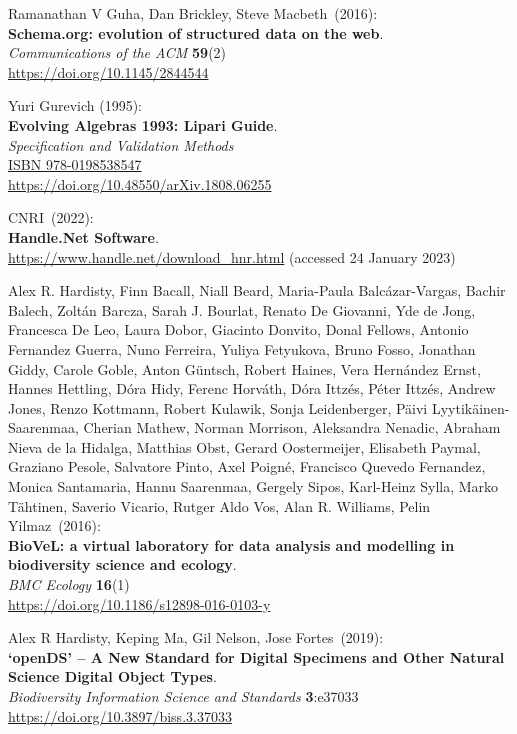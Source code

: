 \begin{thebibliography}{9}
Ramanathan V Guha, Dan Brickley, Steve Macbeth~(2016): \\
\textbf{Schema.org: evolution of structured data on the web}.\\
\emph{Communications of the ACM} \textbf{59}(2)\\
\url{https://doi.org/10.1145/2844544}

Yuri Gurevich (1995):\\
\textbf{Evolving Algebras 1993: Lipari Guide}.\\
\emph{Specification and Validation Methods} \\
\href{https://identifiers.org/isbn/9780198538547}{ISBN 978-0198538547} \\
\url{https://doi.org/10.48550/arXiv.1808.06255}

CNRI~(2022): \\
\textbf{Handle.Net Software}. \\
\url{https://www.handle.net/download_hnr.html} (accessed 24 January
2023)

Alex R. Hardisty, Finn Bacall, Niall Beard, Maria-Paula Balcázar-Vargas, Bachir Balech, Zoltán Barcza, Sarah J. Bourlat, Renato De Giovanni, Yde de Jong, Francesca De Leo, Laura Dobor, Giacinto Donvito, Donal Fellows, Antonio Fernandez Guerra, Nuno Ferreira, Yuliya Fetyukova, Bruno Fosso, Jonathan Giddy, Carole Goble, Anton Güntsch, Robert Haines, Vera Hernández Ernst, Hannes Hettling, Dóra Hidy, Ferenc Horváth, Dóra Ittzés, Péter Ittzés, Andrew Jones, Renzo Kottmann, Robert Kulawik, Sonja Leidenberger, Päivi Lyytikäinen-Saarenmaa, Cherian Mathew, Norman Morrison, Aleksandra Nenadic, Abraham Nieva de la Hidalga, Matthias Obst, Gerard Oostermeijer, Elisabeth Paymal, Graziano Pesole, Salvatore Pinto, Axel Poigné, Francisco Quevedo Fernandez, Monica Santamaria, Hannu Saarenmaa, Gergely Sipos, Karl-Heinz Sylla, Marko Tähtinen, Saverio Vicario, Rutger Aldo Vos, Alan R. Williams, Pelin Yilmaz~(2016): \\
\textbf{BioVeL: a virtual laboratory for data analysis and modelling in biodiversity science and ecology}.\\
\emph{BMC Ecology} \textbf{16}(1)\\
\url{https://doi.org/10.1186/s12898-016-0103-y}

Alex R Hardisty, Keping Ma, Gil Nelson, Jose Fortes~(2019): \\
\textbf{`openDS' -- A New Standard for Digital Specimens and Other
Natural Science Digital Object Types}.\\
\emph{Biodiversity Information Science and Standards}
\textbf{3}:e37033\\
\url{https://doi.org/10.3897/biss.3.37033}


\end{thebibliography}
